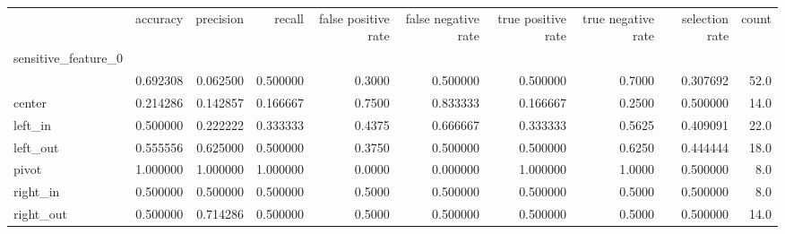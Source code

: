\begin{tabular}{lrrrrrrrrr}
\toprule
{} &  accuracy &  precision &    recall &  false positive rate &  false negative rate &  true positive rate &  true negative rate &  selection rate &  count \\
sensitive\_feature\_0 &           &            &           &                      &                      &                     &                     &                 &        \\
\midrule
                    &  0.692308 &   0.062500 &  0.500000 &               0.3000 &             0.500000 &            0.500000 &              0.7000 &        0.307692 &   52.0 \\
center              &  0.214286 &   0.142857 &  0.166667 &               0.7500 &             0.833333 &            0.166667 &              0.2500 &        0.500000 &   14.0 \\
left\_in             &  0.500000 &   0.222222 &  0.333333 &               0.4375 &             0.666667 &            0.333333 &              0.5625 &        0.409091 &   22.0 \\
left\_out            &  0.555556 &   0.625000 &  0.500000 &               0.3750 &             0.500000 &            0.500000 &              0.6250 &        0.444444 &   18.0 \\
pivot               &  1.000000 &   1.000000 &  1.000000 &               0.0000 &             0.000000 &            1.000000 &              1.0000 &        0.500000 &    8.0 \\
right\_in            &  0.500000 &   0.500000 &  0.500000 &               0.5000 &             0.500000 &            0.500000 &              0.5000 &        0.500000 &    8.0 \\
right\_out           &  0.500000 &   0.714286 &  0.500000 &               0.5000 &             0.500000 &            0.500000 &              0.5000 &        0.500000 &   14.0 \\
\bottomrule
\end{tabular}
